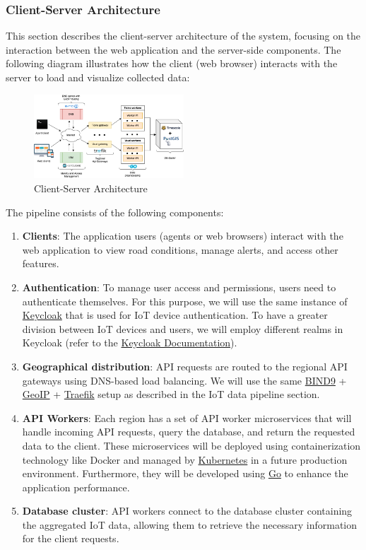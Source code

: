 \subsubsection{Client-Server Architecture}

This section describes the client-server architecture of the system, focusing on the interaction between the web application and the server-side components. The following diagram illustrates how the client (web browser) interacts with the server to load and visualize collected data:

\begin{figure}[h!]
    \centering
    \includegraphics[width=0.5\textwidth]{../../assets/diagrams/web_app_architecture/web_app_architecture.png}
    \caption{Client-Server Architecture}
\end{figure}

The pipeline consists of the following components:

\begin{enumerate}
\item \textbf{Clients}: The application users (agents or web browsers) interact with the web application to view road conditions, manage alerts, and access other features.
\item \textbf{Authentication}: To manage user access and permissions, users need to authenticate themselves. For this purpose, we will use the same instance of \href{https://www.keycloak.org/}{Keycloak} that is used for IoT device authentication. To have a greater division between IoT devices and users, we will employ different realms in Keycloak (refer to the \href{https://www.keycloak.org/docs/latest/server_admin/index.html#core-concepts-and-terms}{Keycloak Documentation}).
\item \textbf{Geographical distribution}: API requests are routed to the regional API gateways using DNS-based load balancing. We will use the same \href{https://www.isc.org/bind/}{BIND9} + \href{https://www.maxmind.com/en/geoip2-databases}{GeoIP} + \href{https://traefik.io/}{Traefik} setup as described in the IoT data pipeline section.
\item \textbf{API Workers}: Each region has a set of API worker microservices that will handle incoming API requests, query the database, and return the requested data to the client. These microservices will be deployed using containerization technology like Docker and managed by \href{https://kubernetes.io/}{Kubernetes} in a future production environment. Furthermore, they will be developed using \href{https://golang.org/}{Go} to enhance the application performance.
\item \textbf{Database cluster}: API workers connect to the database cluster containing the aggregated IoT data, allowing them to retrieve the necessary information for the client requests.
\end{enumerate}
